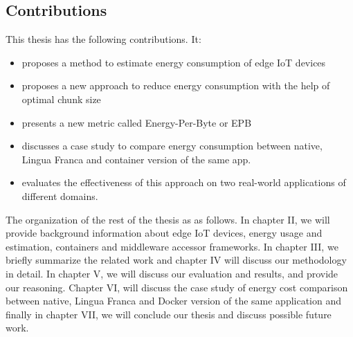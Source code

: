 \subsection{Contributions}
This thesis has the following contributions. It: 
\begin{itemize}
    \item proposes a method to estimate energy consumption of edge IoT devices 
    \item proposes a new approach to reduce energy consumption with the help of optimal chunk size
    \item presents a new metric called Energy-Per-Byte or EPB
    \item discusses a case study to compare energy consumption between native, Lingua Franca 
    and container version of the same app.
    \item evaluates the effectiveness of this approach on two real-world applications of different domains.
\end{itemize}

The organization of the rest of the thesis as as follows. In chapter II, we will provide 
background information about edge IoT devices, energy usage and estimation, containers and middleware 
accessor frameworks. In chapter III, we briefly summarize the related work and chapter IV will discuss 
our methodology in detail. In chapter V, we will discuss our evaluation and results, and provide 
our reasoning. Chapter VI, will discuss the case study of energy cost comparison between native, 
Lingua Franca and Docker version of the same application and finally in chapter VII, we will conclude 
our thesis and discuss possible future work.
